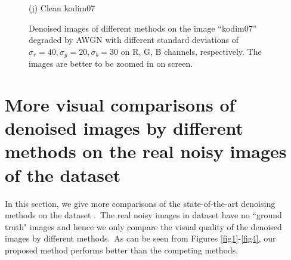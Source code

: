 \documentclass[10pt,onecolumn,letterpaper]{article}
\begin{document}
\begin{figure}
{\begin{minipage}[t]{0.195\textwidth}
{\footnotesize (j) Clean kodim07}
\end{minipage}
}
\caption{Denoised images of different methods on the image ``kodim07'' degraded by AWGN with different standard deviations of $\sigma_{r}=40, \sigma_{g}=20, \sigma_{b}=30$ on R, G, B channels, respectively. The images are better to be zoomed in on screen.}
\label{f1}
\vspace{2mm}
\end{figure}



\clearpage
\section{More visual comparisons of denoised images by different methods on the real noisy images of the dataset \cite{ncwebsite}}

In this section, we give more comparisons of the state-of-the-art denoising methods on the dataset \cite{ncwebsite}.\ The real noisy images in dataset \cite{ncwebsite} have no ``ground truth" images and hence we only compare the visual quality of the denoised images by different methods.\ As can be seen from Figures \ref{fig1}-\ref{fig4}, our proposed method performs better than the competing methods.
\end{document}
